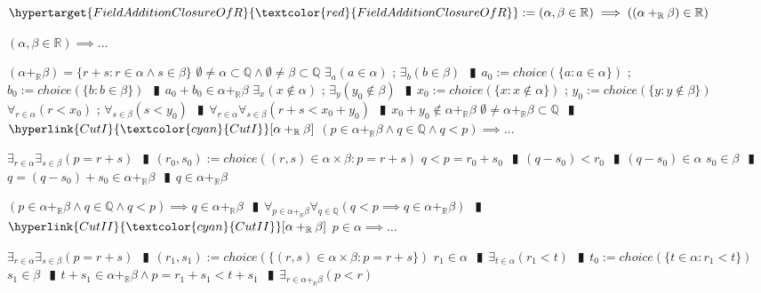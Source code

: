 \documentclass{book}
\newcommand{\df}[1]{\hypertarget{#1}{\textcolor{red}{#1}}}
\newcommand{\rf}[1]{\hyperlink{#1}{\textcolor{cyan}{#1}}}
\newcommand{\abr}{:=}
\newcommand{\pipe}{$\phantom{(}\vrectangleblack\phantom{)}$}
\newcommand{\pr}[1]{\left(#1\right)}
\begin{document}
$\df{FieldAdditionClosureOfR} \abr (\alpha, \beta \in \mathbb{R}) \implies \pr{(\alpha +_{\mathbb{R}} \beta) \in \mathbb{R}}$
\begin{enumerate}
  \lit $(\alpha, \beta \in \mathbb{R}) \implies \ldots$
  \begin{enumerate}
    \lit $(\alpha +_{\mathbb{R}} \beta) = \{r + s : r \in \alpha \land s \in \beta\}$
    \lit $\emptyset \neq \alpha \subset \mathbb{Q} \land \emptyset \neq \beta \subset \mathbb{Q}$
    \lit $\exists_{a}(a \in \alpha)$ ; $\exists_{b}(b \in \beta)$ \pipe $a_0 \abr choice(\{a : a \in \alpha\})$ ; $b_0 \abr choice(\{b : b \in \beta\})$ \pipe $a_0  + b_0 \in \alpha +_{\mathbb{R}} \beta$
    \lit $\exists_{x}(x \notin \alpha)$ ; $\exists_{y}(y_0 \notin \beta)$ \pipe $x_0 \abr choice(\{x : x \notin \alpha\})$ ; $y_0 \abr choice(\{y : y \notin \beta\})$
    \lit $\forall_{r \in \alpha}(r < x_0)$ ; $\forall_{s \in \beta}(s < y_0)$ \pipe $\forall_{r \in \alpha} \forall_{s \in \beta}(r + s < x_0 + y_0)$ \pipe $x_0 + y_0 \not \in \alpha +_{\mathbb{R}} \beta$
    \lit $\emptyset \neq \alpha +_{\mathbb{R}} \beta \subset \mathbb{Q}$ \pipe $\rf{CutI}[\alpha +_{\mathbb{R}} \beta]$
    \lit $(p \in \alpha +_{\mathbb{R}} \beta \land q \in \mathbb{Q} \land q < p) \implies \ldots$
    \begin{enumerate}
      \lit $\exists_{r \in \alpha} \exists_{s \in \beta}(p = r + s)$ \pipe $(r_0, s_0) \abr choice\pr{{(r, s) \in \alpha \times \beta : p = r + s}}$
      \lit $q < p = r_0 + s_0$ \pipe $(q - s_0) < r_0$ \pipe $(q - s_0) \in \alpha$
      \lit $s_0 \in \beta$ \pipe $q = (q - s_0) + s_0 \in \alpha +_{\mathbb{R}} \beta$ \pipe $q \in \alpha +_{\mathbb{R}} \beta$
    \end{enumerate}
    \lit $(p \in \alpha +_{\mathbb{R}} \beta \land q \in \mathbb{Q} \land q < p) \implies q \in \alpha +_{\mathbb{R}} \beta$ \pipe $\forall_{p \in \alpha +_{\mathbb{R}} \beta} \forall_{q \in \mathbb{Q}}(q < p \implies q \in \alpha +_{\mathbb{R}} \beta)$ \pipe $\rf{CutII}[\alpha +_{\mathbb{R}} \beta]$
    \lit $p \in \alpha \implies \ldots$
    \begin{enumerate}
      \lit $\exists_{r \in \alpha} \exists_{s \in \beta}(p = r + s)$ \pipe $(r_1, s_1) \abr choice\pr{\{(r, s) \in \alpha \times \beta : p = r + s\}}$
      \lit $r_1 \in \alpha$ \pipe $\exists_{t \in \alpha}(r_1 < t)$ \pipe $t_0 \abr choice(\{t \in \alpha : r_1 < t\})$
      \lit $s_1 \in \beta$ \pipe $t + s_1 \in \alpha +_{\mathbb{R}} \beta \land p = r_1 + s_1 < t + s_1$ \pipe $\exists_{r \in \alpha +_{\mathbb{R}} \beta}(p < r)$

\end{enumerate}
\end{enumerate}
\end{enumerate}
\end{document}
